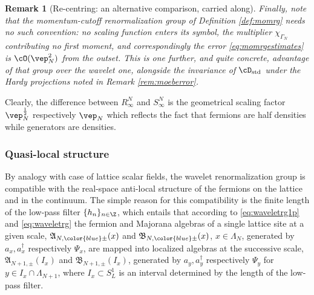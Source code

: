 \documentclass[a4paper, 11pt]{article}
\newcommand{\fA}{\mathfrak{A}}\newcommand{\cA}{\mathcal{A}}\newcommand{\dA}{\mathds{A}}\newcommand{\sA}{\mathscr{A}}
\newcommand{\fB}{\mathfrak{B}}\newcommand{\cB}{\mathcal{B}}\newcommand{\dB}{\mathds{B}}\newcommand{\sB}{\mathscr{B}}
\DeclareMathOperator{\1}{\mathds{1}}
\DeclareMathOperator{\std}{std}
\newtheorem{rem}[thm]{Remark}
\begin{document}
\begin{rem}[Re-centring: an alternative comparison, carried along]
Finally, note that the momentum-cutoff renormalization group of Definition \ref{def:momrg} needs no such convention: no scaling function enters its symbol, the multiplier $\chi_{\Gamma_{N}}$ contributing no first moment, and correspondingly the error \eqref{eq:momrgestimates} is $\cO(\vep_{N}^{2})$ from the outset. This is one further, and quite concrete, advantage of that group over the wavelet one, alongside the invariance of $\cD_{\std}$ under the Hardy projections noted in Remark \ref{rem:moeberror}.
\end{rem}

Clearly, the difference between $R^{N}_{\infty}$ and $S^{N}_{\infty}$ is the geometrical scaling factor $\vep_{N}^{\frac{1}{2}}$ respectively $\vep_{N}$ which reflects the fact that fermions are half densities while generators are densities.

\subsubsection{Quasi-local structure}
\label{sec:antiloc}
By analogy with case of lattice scalar fields, the wavelet renormalization group is compatible with the real-space anti-local structure of the fermions on the lattice and in the continuum. The simple reason for this compatibility is the finite length of the low-pass filter $\{h_{n}\}_{n\in\Z}$, which entails that according to \eqref{eq:waveletrg1p} and \eqref{eq:waveletrg} the fermion and Majorana algebras of a single lattice site at a given scale, $\fA_{N,{\color{blue}\pm}}(x)$ and $\fB_{N,{\color{blue}\pm}}(x)$, $x\in\Lambda_{N}$, generated by $a_{x}, a^{\dag}_{x}$ respectively $\Psi_{x}$, are mapped into localized algebras at the successive scale, $\fA_{N+1,\pm}(I_{x})$ and $\fB_{N+1,\pm}(I_{x})$, generated by $a_{y}, a^{\dag}_{y}$ respectively $\Psi_{y}$ for $y\in I_{x}\cap\Lambda_{N+1}$, where $I_{x}\subset S^{1}_{L}$ is an interval determined by the length of the low-pass filter. 
\end{document}
